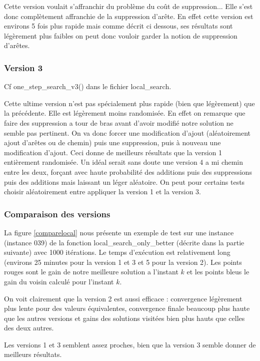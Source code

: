 \documentclass[10pt,a4paper]{article}
\begin{document}
Cette version voulait s'affranchir du problème du coût de suppression... Elle s'est donc complètement affranchie de la suppression d'arête. En effet cette version est environs 5 fois plus rapide mais comme décrit ci dessous, ses résultats sont légèrement plus faibles on peut donc vouloir garder la notion de suppression d'arêtes.

\subsubsection{Version 3}

Cf one\_step\_search\_v3() dans le fichier local\_search.

Cette ultime version n'est pas spécialement plus rapide (bien que légèrement) que la précédente. Elle est légèrement moins randomisée. En effet on remarque que faire des suppression a tour de bras avant d'avoir modifié notre solution ne semble pas pertinent. On va donc forcer une modification d'ajout (aléatoirement ajout d'arêtes ou de chemin) puis une suppression, puis à nouveau une modification d'ajout. Ceci donne de meilleurs résultats que la version 1 entièrement randomisée. Un idéal serait sans doute une version 4 a mi chemin entre les deux, forçant avec haute probabilité des additions puis des suppressions puis des additions mais laissant un léger aléatoire. On peut pour certains tests choisir aléatoirement entre appliquer la version 1 et la version 3. 


\subsubsection{Comparaison des versions}

La figure \ref{comparelocal} nous présente un exemple de test sur une instance (instance 039) de la fonction local\_search\_only\_better (décrite dans la partie suivante) avec 1000 itérations. Le temps d’exécution est relativement long (environs 25 minutes pour la version 1 et 3 et 5 pour la version 2). Les points rouges sont le gain de notre meilleure solution a l'instant $k$ et les points bleus le gain du voisin calculé pour l'instant $k$.

On voit clairement que la version 2 est aussi efficace : convergence légèrement plus lente pour des valeurs équivalentes, convergence finale beaucoup plus haute que les autres versions et gains des solutions visitées bien plus hauts que celles des deux autres. 

Les versions 1 et 3 semblent assez proches, bien que la version 3 semble donner de meilleurs résultats.
\end{document}
